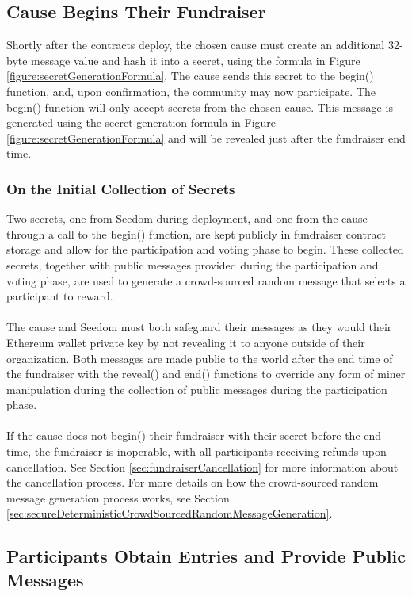 \documentclass[11pt]{article}
\begin{document}
\subsection{Cause Begins Their Fundraiser}

Shortly after the contracts deploy, the chosen cause must create an additional 32-byte message value and hash it into a secret, using the formula in Figure \ref{figure:secretGenerationFormula}. The cause sends this secret to the begin() function, and, upon confirmation, the community may now participate. The begin() function will only accept secrets from the chosen cause. This message is generated using the secret generation formula in Figure \ref{figure:secretGenerationFormula} and will be revealed just after the fundraiser end time.

\subsubsection{On the Initial Collection of Secrets}

Two secrets, one from Seedom during deployment, and one from the cause through a call to the begin() function, are kept publicly in fundraiser contract storage and allow for the participation and voting phase to begin. These collected secrets, together with public messages provided during the participation and voting phase, are used to generate a crowd-sourced random message that selects a participant to reward.\\\\
The cause and Seedom must both safeguard their messages as they would their Ethereum wallet private key by not revealing it to anyone outside of their organization. Both messages are made public to the world after the end time of the fundraiser with the reveal() and end() functions to override any form of miner manipulation during the collection of public messages during the participation phase.\\\\
If the cause does not begin() their fundraiser with their secret before the end time, the fundraiser is inoperable, with all participants receiving refunds upon cancellation. See Section \ref{sec:fundraiserCancellation} for more information about the cancellation process. For more details on how the crowd-sourced random message generation process works, see Section \ref{sec:secureDeterministicCrowdSourcedRandomMessageGeneration}.

\subsection{Participants Obtain Entries and Provide Public Messages}
\end{document}
